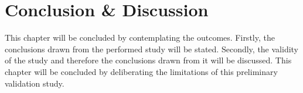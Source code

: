 
%



\section{Conclusion \& Discussion}
This chapter will be concluded by contemplating the outcomes. Firstly, the conclusions drawn from the performed study will be stated. Secondly, the validity of the study and therefore the conclusions drawn from it will be discussed. This chapter will be concluded by deliberating the limitations of this preliminary validation study.
